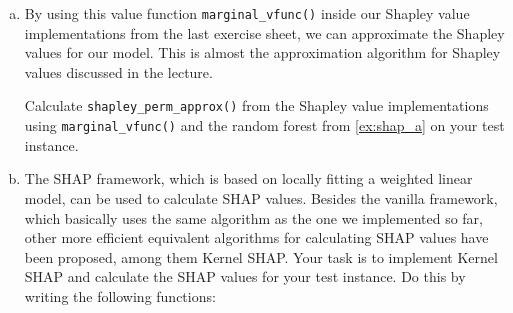 {\begin{enumerate}[a)]
    \item 
    By using this value function \texttt{marginal\_vfunc()} inside our Shapley value implementations
    from the last exercise sheet,
    we can approximate the Shapley values for our model.
    This is almost the approximation algorithm for Shapley values discussed in the lecture.

    Calculate \texttt{shapley\_perm\_approx()} from the Shapley value implementations using \texttt{marginal\_vfunc()} and the random forest from \ref{ex:shap_a} on your test instance.

    \item 
    The SHAP framework, which is based on locally fitting a weighted linear model, can be used to calculate SHAP values.
    Besides the vanilla framework, which basically uses the same algorithm as the one we implemented so far, other more efficient equivalent algorithms for calculating SHAP values have been proposed, among them Kernel SHAP.
    Your task is to implement Kernel SHAP and calculate the SHAP values for your test instance.
    Do this by writing the following functions:
    

\end{enumerate}}
